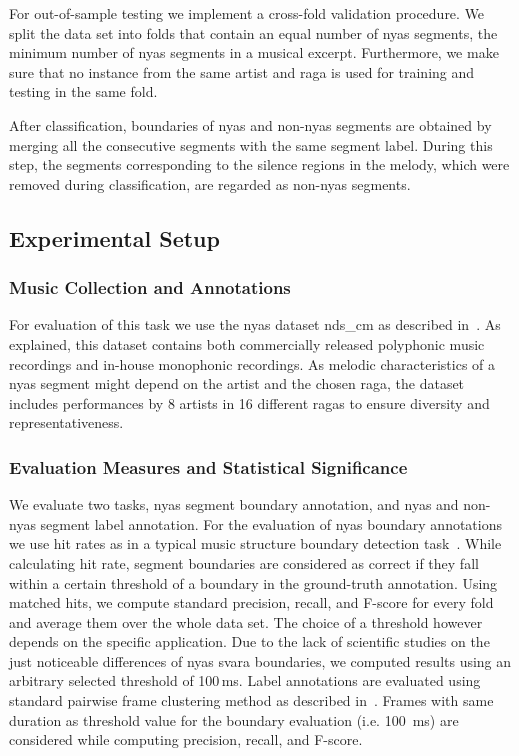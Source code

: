{For out-of-sample testing we implement a cross-fold validation procedure. We split the data set into folds that contain an equal number of \gls{nyas} segments, the minimum number of \gls{nyas} segments in a musical excerpt. Furthermore, we make sure that no instance from the same artist and \gls{raga} is used for training and testing in the same fold.

After classification, boundaries of \gls{nyas} and non-\gls{nyas} segments are obtained by merging all the consecutive segments with the same segment label. During this step, the segments corresponding to the silence regions in the melody, which were removed during classification, are regarded as non-\gls{nyas} segments.

\subsection{Experimental Setup}
\label{sec:pre_processing_nyas_segmentation_experimental_setup}

\subsubsection{Music Collection and Annotations}

For evaluation of this task we use the \gls{nyas} dataset \acrshort{nds_cm} as described in~. As explained, this dataset contains both commercially released polyphonic music recordings and in-house monophonic recordings. As melodic characteristics of a \gls{nyas} segment might depend on the artist and the chosen \gls{raga}, the dataset includes performances by 8 artists in 16 different \glspl{raga} to ensure diversity and representativeness.

\subsubsection{Evaluation Measures and Statistical Significance}

We evaluate two tasks, \gls{nyas} segment boundary annotation, and \gls{nyas} and non-\gls{nyas} segment label annotation. For the evaluation of \gls{nyas} boundary annotations we use hit rates as in a typical music structure boundary detection task~\citep{Ong05ICMC}. While calculating hit rate, segment boundaries are considered as correct if they fall within a certain threshold of a boundary in the ground-truth annotation. Using matched hits, we compute standard precision, recall, and F-score for every fold and average them over the whole data set. The choice of a threshold however depends on the specific application. Due to the lack of scientific studies on the just noticeable differences of \gls{nyas} \gls{svara} boundaries, we computed results using an arbitrary selected threshold of 100\,ms. Label annotations are evaluated using standard pairwise frame clustering method as described in~\cite{levy2008structural}. Frames with same duration as threshold value for the boundary evaluation (i.e. 100~ms) are considered while computing precision, recall, and F-score. 

}
